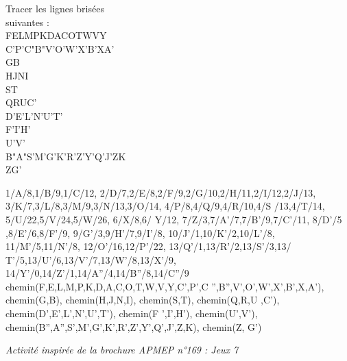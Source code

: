 \begin{activite}
\begin{minipage}{4cm}
          Tracer les lignes brisées \\
          suivantes : \\ [3mm]
          FELMPKDACOTWVY \\
          C'P’C"B"V’O’W’X’B’XA’  \\ [3mm]
          GB \\ [3mm]
          HJNI \\ [3mm]
          ST \\ [3mm]
          QRUC’ \\ [3mm]
          D’E’L’N’U’T’ \\ [3mm]
          F’I’H’ \\ [3mm]
          U’V’ \\ [3mm]
          B"A"S’M’G’K’R’Z’Y’Q’J’ZK \\ [3mm]
          ZG’
       \end{minipage}
       \qquad
       \begin{minipage}{10cm}
             {1/A/8,1/B/9,1/C/12,
             2/D/7,2/E/8,2/F/9,2/G/10,2/H/11,2/I/12,2/J/13,
             3/K/7,3/L/8,3/M/9,3/N/13,3/O/14,
             4/P/8,4/Q/9,4/R/10,4/S /13,4/T/14,
             5/U/22,5/V/24,5/W/26,
             6/X/8,6/ Y/12,
             7/Z/3,7/A'/7,7/B'/9,7/C'/11,
             8/D'/5 ,8/E'/6,8/F'/9,
             9/G'/3,9/H'/7,9/I'/8,
             10/J'/1,10/K'/2,10/L'/8,
             11/M'/5,11/N'/8,
             12/O'/16,12/P'/22,
             13/Q'/1,13/R'/2,13/S'/3,13/ T'/5,13/U'/6,13/V'/7,13/W'/8,13/X'/9,
             14/Y'/0,14/Z'/1,14/A''/4,14/B''/8,14/C''/9}
             {chemin(F,E,L,M,P,K,D,A,C,O,T,W,V,Y,C',P',C '',B'',V',O',W',X',B',X,A'),
             chemin(G,B),
             chemin(H,J,N,I),
             chemin(S,T),
             chemin(Q,R,U ,C'),
             chemin(D',E',L',N',U',T'),
             chemin(F ',I',H'),
             chemin(U',V'),
             chemin(B'',A'',S',M',G',K',R',Z',Y',Q',J',Z,K),
             chemin(Z, G')}
       \end{minipage} \smallskip
    \vfill\hfill{\it\small Activité inspirée de la brochure APMEP n°169 : \og Jeux 7 \fg}
 \end{activite}